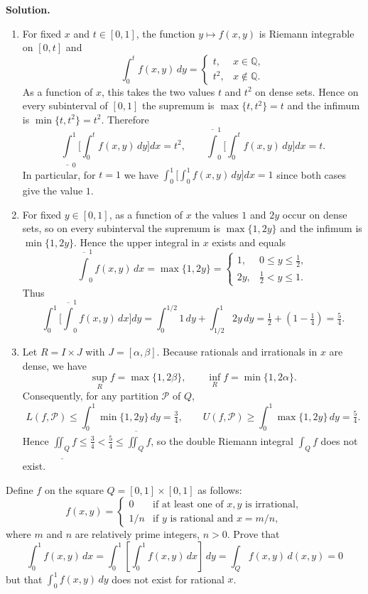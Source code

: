\noindent\textbf{Solution.}
\begin{enumerate}[label=(\alph*)]
\item For fixed $x$ and $t\in[0,1]$, the function $y\mapsto f(x,y)$ is Riemann integrable on $[0,t]$ and
\[\int_0^t f(x,y)\,dy = \begin{cases} t, & x\in\mathbb Q, \\[4pt] t^2, & x\notin\mathbb Q.\end{cases}\]
As a function of $x$, this takes the two values $t$ and $t^2$ on dense sets. Hence on every subinterval of $[0,1]$ the supremum is $\max\{t,t^2\}=t$ and the infimum is $\min\{t,t^2\}=t^2$. Therefore
\[ \underline\int_0^1\!\Big[\int_0^t f(x,y)\,dy\Big]dx = t^2,\qquad \overline\int_0^1\!\Big[\int_0^t f(x,y)\,dy\Big]dx = t. \]
In particular, for $t=1$ we have $\int_0^1\!\big[\int_0^1 f(x,y)\,dy\big]dx=1$ since both cases give the value $1$.

\item For fixed $y\in[0,1]$, as a function of $x$ the values $1$ and $2y$ occur on dense sets, so on every subinterval the supremum is $\max\{1,2y\}$ and the infimum is $\min\{1,2y\}$. Hence the upper integral in $x$ exists and equals
\[ \overline\int_0^1 f(x,y)\,dx = \max\{1,2y\} = \begin{cases} 1, & 0\le y\le \tfrac12, \\[4pt] 2y, & \tfrac12< y\le 1. \end{cases} \]
Thus
\[ \int_0^1\!\Big[\overline\int_0^1 f(x,y)\,dx\Big]dy = \int_0^{1/2}\!1\,dy + \int_{1/2}^1\!2y\,dy = \tfrac12 + (1-\tfrac14) = \tfrac{5}{4}. \]

\item Let $R=I\times J$ with $J=[\alpha,\beta]$. Because rationals and irrationals in $x$ are dense, we have
\[ \sup_R f = \max\{1,2\beta\},\qquad \inf_R f=\min\{1,2\alpha\}. \]
Consequently, for any partition $\mathcal P$ of $Q$,
\[ L(f,\mathcal P) \le \int_0^1 \min\{1,2y\}\,dy = \tfrac{3}{4},\qquad U(f,\mathcal P) \ge \int_0^1 \max\{1,2y\}\,dy = \tfrac{5}{4}. \]
Hence $\underline{\iint_Q} f \le \tfrac34 < \tfrac54 \le \overline{\iint_Q} f$, so the double Riemann integral $\int_Q f$ does not exist.
\end{enumerate}

\begin{problembox}
Define \( f \) on the square \( Q = [0, 1] \times [0, 1] \) as follows:
\[f(x, y) = 
\begin{cases} 
0 & \text{if at least one of } x, y \text{ is irrational}, \\ 
1/n & \text{if } y \text{ is rational and } x = m/n,
\end{cases}\]
where \( m \) and \( n \) are relatively prime integers, \( n > 0 \). Prove that
\[\int_{0}^{1} f(x, y) \, dx = \int_{0}^{1} \left[ \int_{0}^{1} f(x, y) \, dx \right] \, dy = \int_{Q} f(x, y) \, d(x, y) = 0\]
but that \( \int_{0}^{1} f(x, y) \, dy \) does not exist for rational \( x \).
\end{problembox}

